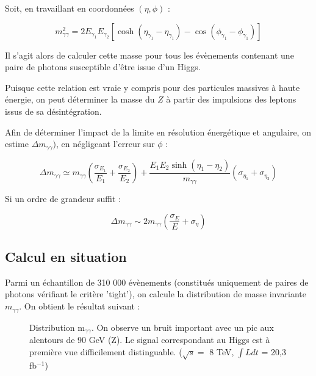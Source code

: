 \documentclass[11pt]{article} %
\begin{document}
Soit, en travaillant en coordonnées $(\eta, \phi)$ :

\begin{equation}
m_{\gamma \gamma}^2 = 2 E_{\gamma_1} E_{\gamma_2} \left [ \cosh {\left( \eta_{\gamma_1} - \eta_{\gamma_1} \right)} - \cos{\left( \phi_{\gamma_1} - \phi_{\gamma_1} \right)} \right ]
\end{equation}

Il s'agit alors de calculer cette masse pour tous les évènements contenant une paire de photons susceptible d'être issue d'un Higgs. 

Puisque cette relation est vraie y compris pour des particules massives à haute énergie, on peut déterminer la masse du $Z$ à partir des impulsions des leptons issus de sa désintégration.

Afin  de déterminer l'impact de la limite en résolution énergétique et angulaire, on estime $\Delta m_{\gamma\gamma})$, en négligeant l'erreur sur $\phi$ :

\begin{equation}
\Delta m_{\gamma\gamma} \simeq m_{\gamma \gamma}\left( \dfrac{\sigma_{E_1}}{E_1} +  \dfrac{\sigma_{E_2}}{E_2}\right) + \dfrac{E_1E_2 \sinh {(\eta_1 - \eta_2)}}{m_{\gamma \gamma}} \left( \sigma_{\eta_1} + \sigma_{\eta_2} \right)
\end{equation}

Si un ordre de grandeur suffit :

\begin{equation}
\Delta m_{\gamma\gamma} \sim 2m_{\gamma \gamma}\left ( \dfrac{\sigma_E}{E} +  \sigma_{\eta} \right )
\end{equation}

\subsection{Calcul en situation}

Parmi un échantillon de 310 000 évènements (constitués uniquement de paires de photons vérifiant le critère 'tight'), on calcule la distribution de masse invariante $m_{\gamma \gamma}$. On obtient le résultat suivant :

\begin{figure}[H]
\centering
  \caption{Distribution m$_{\gamma \gamma}$. On observe un bruit important avec un pic aux alentours de 90 GeV (Z). Le signal correspondant au Higgs est à première vue difficilement distinguable. ($\sqrt{s} =$ 8 TeV,  $\int L dt$ = 20,3 fb$^{-1}$) }
 \resizebox{.9\linewidth}{!}{}
\end{figure}
\end{document}
